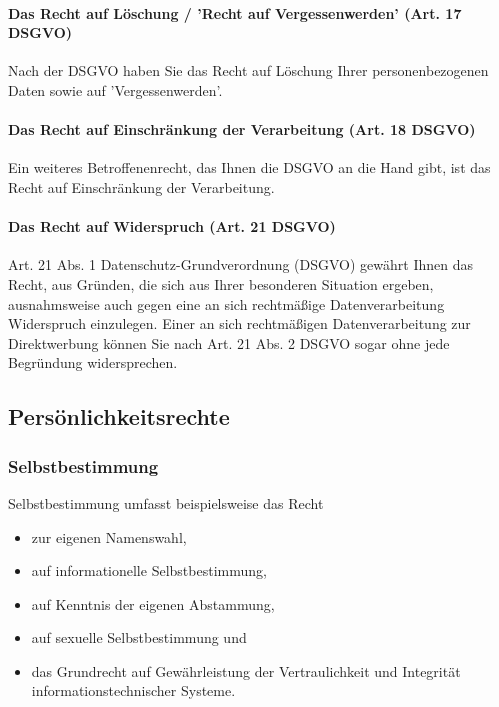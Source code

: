 \paragraph{Das Recht auf Löschung / 'Recht auf Vergessenwerden' (Art. 17 DSGVO)} Nach der DSGVO haben Sie das Recht auf Löschung Ihrer personenbezogenen Daten sowie auf 'Vergessenwerden'.

\paragraph{Das Recht auf Einschränkung der Verarbeitung (Art. 18 DSGVO)} Ein weiteres Betroffenenrecht, das Ihnen die DSGVO an die Hand gibt, ist das Recht auf Einschränkung der Verarbeitung.

\paragraph{Das Recht auf Widerspruch (Art. 21 DSGVO)} Art. 21 Abs. 1 Datenschutz-Grundverordnung (DSGVO) gewährt Ihnen das Recht, aus Gründen, die sich aus Ihrer besonderen Situation ergeben, ausnahmsweise auch gegen eine an sich rechtmäßige Datenverarbeitung Widerspruch einzulegen. Einer an sich rechtmäßigen Datenverarbeitung zur Direktwerbung können Sie nach Art. 21 Abs. 2 DSGVO sogar ohne jede Begründung widersprechen.

\subsection{Persönlichkeitsrechte}
\label{sec:Persoenlichkeitsrechte}


\subsubsection{Selbstbestimmung}
\label{sec:Selbstbestimmung}

Selbstbestimmung umfasst beispielsweise das Recht

\begin{itemize}
	\item zur eigenen Namenswahl,
	\item auf informationelle Selbstbestimmung,
	\item auf Kenntnis der eigenen Abstammung,
	\item auf sexuelle Selbstbestimmung und
	\item das Grundrecht auf Gewährleistung der Vertraulichkeit und Integrität informationstechnischer Systeme.
\end{itemize}

